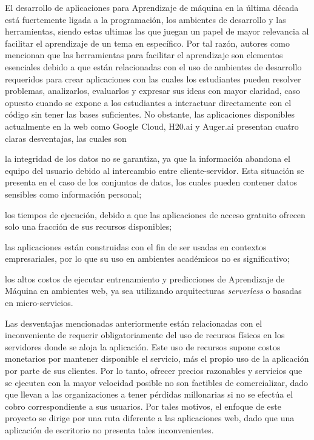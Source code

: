 El desarrollo de aplicaciones para Aprendizaje de máquina en la última década está fuertemente ligada a la programación, los ambientes de desarrollo y las herramientas, siendo estas ultimas las que juegan un papel de mayor relevancia al facilitar el aprendizaje de un tema en específico. Por tal razón, autores como \textcite{Francis1983, Salleh2013} mencionan que las herramientas para facilitar el aprendizaje son elementos esenciales debido a que están relacionadas con el uso de ambientes de desarrollo requeridos para crear aplicaciones con las cuales los estudiantes pueden resolver problemas, analizarlos, evaluarlos y expresar sus ideas con mayor claridad, caso opuesto cuando se expone a los estudiantes a interactuar directamente con el código sin tener las bases suficientes. No obstante, las aplicaciones disponibles actualmente en la web como Google Cloud, H20.ai y Auger.ai presentan cuatro claras desventajas, las cuales son 
\begin{seriate}
    \item la integridad de los datos no se garantiza, ya que la información abandona el equipo del usuario debido al intercambio entre cliente-servidor. Esta situación se presenta en el caso de los conjuntos de datos, los cuales pueden contener datos sensibles como información personal;
    \item los tiempos de ejecución, debido a que las aplicaciones de acceso gratuito ofrecen solo una fracción de sus recursos disponibles;
    \item las aplicaciones están construidas con el fin de ser usadas en contextos empresariales, por lo que su uso en ambientes académicos no es significativo;
    \item los altos costos de ejecutar entrenamiento y predicciones de Aprendizaje de Máquina en ambientes web, ya sea utilizando arquitecturas \textit{serverless} o basadas en micro-servicios.
\end{seriate}

Las desventajas mencionadas anteriormente están relacionadas con el inconveniente de requerir obligatoriamente del uso de recursos físicos en los servidores donde se aloja la aplicación. Este uso de recursos supone costos monetarios por mantener disponible el servicio, más el propio uso de la aplicación por parte de sus clientes. Por lo tanto, ofrecer precios razonables y servicios que se ejecuten con la mayor velocidad posible no son factibles de comercializar, dado que llevan a las organizaciones a tener pérdidas millonarias si no se efectúa el cobro correspondiente a sus usuarios. Por tales motivos, el enfoque de este proyecto se dirige por una ruta diferente a las aplicaciones web, dado que una aplicación de escritorio no presenta tales inconvenientes.





